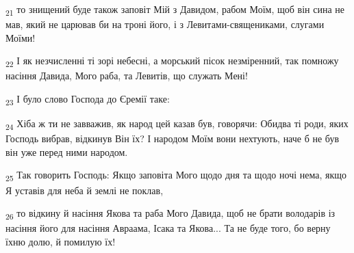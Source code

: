 \begin{tcolorbox}
\textsubscript{21} то знищений буде також заповіт Мій з Давидом, рабом Моїм, щоб він сина не мав, який не царював би на троні його, і з Левитами-священиками, слугами Моїми!
\end{tcolorbox}
\begin{tcolorbox}
\textsubscript{22} І як незчисленні ті зорі небесні, а морський пісок незміренний, так помножу насіння Давида, Мого раба, та Левитів, що служать Мені!
\end{tcolorbox}
\begin{tcolorbox}
\textsubscript{23} І було слово Господа до Єремії таке:
\end{tcolorbox}
\begin{tcolorbox}
\textsubscript{24} Хіба ж ти не завважив, як народ цей казав був, говорячи: Обидва ті роди, яких Господь вибрав, відкинув Він їх? І народом Моїм вони нехтують, наче б не був він уже перед ними народом.
\end{tcolorbox}
\begin{tcolorbox}
\textsubscript{25} Так говорить Господь: Якщо заповіта Мого щодо дня та щодо ночі нема, якщо Я уставів для неба й землі не поклав,
\end{tcolorbox}
\begin{tcolorbox}
\textsubscript{26} то відкину й насіння Якова та раба Мого Давида, щоб не брати володарів із насіння його для насіння Авраама, Ісака та Якова... Та не буде того, бо верну їхню долю, й помилую їх!
\end{tcolorbox}
